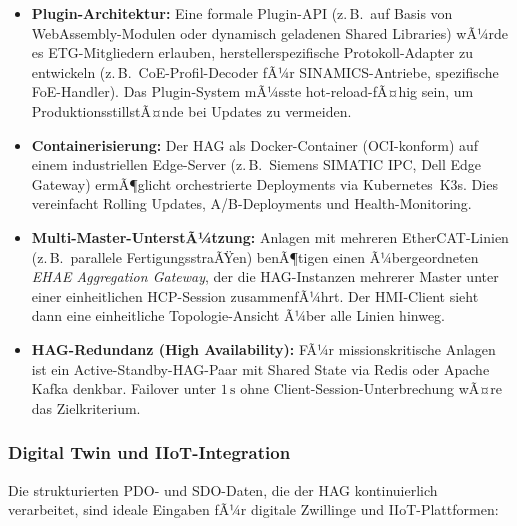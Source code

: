 ﻿\documentclass[12pt,a4paper]{article}
\begin{document}
\begin{itemize}[leftmargin=2em]
  \item \textbf{Plugin-Architektur:} Eine formale Plugin-API (z.\,B.\ auf Basis
    von WebAssembly-Modulen oder dynamisch geladenen Shared Libraries) wÃ¼rde
    es ETG-Mitgliedern erlauben, herstellerspezifische Protokoll-Adapter zu
    entwickeln (z.\,B.\ CoE-Profil-Decoder fÃ¼r SINAMICS-Antriebe, spezifische
    FoE-Handler). Das Plugin-System mÃ¼sste hot-reload-fÃ¤hig sein, um
    ProduktionsstillstÃ¤nde bei Updates zu vermeiden.
  \item \textbf{Containerisierung:} Der HAG als Docker-Container (OCI-konform)
    auf einem industriellen Edge-Server (z.\,B.\ Siemens SIMATIC IPC, Dell
    Edge Gateway) ermÃ¶glicht orchestrierte Deployments via Kubernetes~K3s.
    Dies vereinfacht Rolling Updates, A/B-Deployments und Health-Monitoring.
  \item \textbf{Multi-Master-UnterstÃ¼tzung:} Anlagen mit mehreren EtherCAT-Linien
    (z.\,B.\ parallele FertigungsstraÃŸen) benÃ¶tigen einen Ã¼bergeordneten
    \emph{EHAE Aggregation Gateway}, der die HAG-Instanzen mehrerer Master
    unter einer einheitlichen HCP-Session zusammenfÃ¼hrt. Der HMI-Client sieht
    dann eine einheitliche Topologie-Ansicht Ã¼ber alle Linien hinweg.
  \item \textbf{HAG-Redundanz (High Availability):} FÃ¼r missionskritische Anlagen
    ist ein Active-Standby-HAG-Paar mit Shared State via Redis oder
    Apache Kafka denkbar. Failover unter $1\,\si{\second}$ ohne
    Client-Session-Unterbrechung wÃ¤re das Zielkriterium.
\end{itemize}

\subsubsection*{Digital Twin und IIoT-Integration}

Die strukturierten PDO- und SDO-Daten, die der HAG kontinuierlich verarbeitet,
sind ideale Eingaben fÃ¼r digitale Zwillinge und IIoT-Plattformen:
\end{document}
